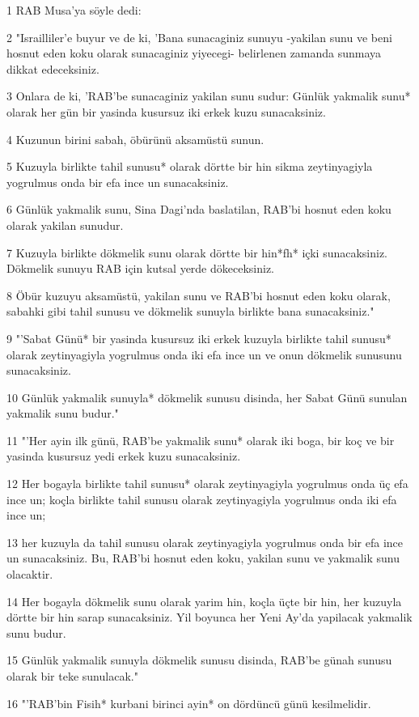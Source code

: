 \par 1 RAB Musa'ya söyle dedi:
\par 2 "Israilliler'e buyur ve de ki, 'Bana sunacaginiz sunuyu -yakilan sunu ve beni hosnut eden koku olarak sunacaginiz yiyecegi- belirlenen zamanda sunmaya dikkat edeceksiniz.
\par 3 Onlara de ki, 'RAB'be sunacaginiz yakilan sunu sudur: Günlük yakmalik sunu* olarak her gün bir yasinda kusursuz iki erkek kuzu sunacaksiniz.
\par 4 Kuzunun birini sabah, öbürünü aksamüstü sunun.
\par 5 Kuzuyla birlikte tahil sunusu* olarak dörtte bir hin sikma zeytinyagiyla yogrulmus onda bir efa ince un sunacaksiniz.
\par 6 Günlük yakmalik sunu, Sina Dagi'nda baslatilan, RAB'bi hosnut eden koku olarak yakilan sunudur.
\par 7 Kuzuyla birlikte dökmelik sunu olarak dörtte bir hin*fh* içki sunacaksiniz. Dökmelik sunuyu RAB için kutsal yerde dökeceksiniz.
\par 8 Öbür kuzuyu aksamüstü, yakilan sunu ve RAB'bi hosnut eden koku olarak, sabahki gibi tahil sunusu ve dökmelik sunuyla birlikte bana sunacaksiniz."
\par 9 "'Sabat Günü* bir yasinda kusursuz iki erkek kuzuyla birlikte tahil sunusu* olarak zeytinyagiyla yogrulmus onda iki efa ince un ve onun dökmelik sunusunu sunacaksiniz.
\par 10 Günlük yakmalik sunuyla* dökmelik sunusu disinda, her Sabat Günü sunulan yakmalik sunu budur."
\par 11 "'Her ayin ilk günü, RAB'be yakmalik sunu* olarak iki boga, bir koç ve bir yasinda kusursuz yedi erkek kuzu sunacaksiniz.
\par 12 Her bogayla birlikte tahil sunusu* olarak zeytinyagiyla yogrulmus onda üç efa ince un; koçla birlikte tahil sunusu olarak zeytinyagiyla yogrulmus onda iki efa ince un;
\par 13 her kuzuyla da tahil sunusu olarak zeytinyagiyla yogrulmus onda bir efa ince un sunacaksiniz. Bu, RAB'bi hosnut eden koku, yakilan sunu ve yakmalik sunu olacaktir.
\par 14 Her bogayla dökmelik sunu olarak yarim hin, koçla üçte bir hin, her kuzuyla dörtte bir hin sarap sunacaksiniz. Yil boyunca her Yeni Ay'da yapilacak yakmalik sunu budur.
\par 15 Günlük yakmalik sunuyla dökmelik sunusu disinda, RAB'be günah sunusu olarak bir teke sunulacak."
\par 16 "'RAB'bin Fisih* kurbani birinci ayin* on dördüncü günü kesilmelidir.
